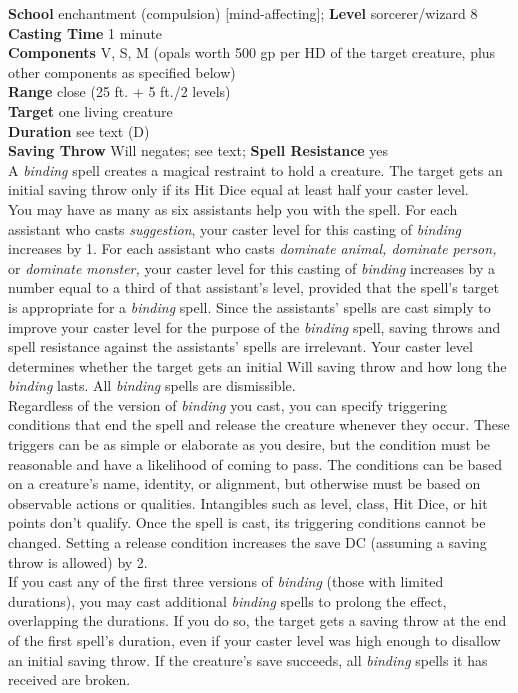\textbf{School} enchantment (compulsion) [mind-affecting]; \textbf{Level} sorcerer/wizard 8\\
\textbf{Casting Time} 1 minute\\
\textbf{Components} V, S, M (opals worth 500 gp per HD of the target creature, plus other components as specified below)\\
\textbf{Range} close (25 ft. + 5 ft./2 levels)\\
\textbf{Target} one living creature\\
\textbf{Duration} see text (D)\\
\textbf{Saving Throw }Will negates; see text; \textbf{Spell Resistance} yes\\
A \textit{binding }spell creates a magical restraint to hold a creature. The target gets an initial saving throw only if its Hit Dice equal at least half your caster level.\\
You may have as many as six assistants help you with the spell. For each assistant who casts \textit{suggestion}, your caster level for this casting of \textit{binding }increases by 1. For each assistant who casts \textit{dominate animal, dominate person, }or \textit{dominate monster, }your caster level for this casting of \textit{binding }increases by a number equal to a third of that assistant's level, provided that the spell's target is appropriate for a \textit{binding }spell. Since the assistants' spells are cast simply to improve your caster level for the purpose of the \textit{binding }spell, saving throws and spell resistance against the assistants' spells are irrelevant. Your caster level determines whether the target gets an initial Will saving throw and how long the \textit{binding }lasts. All \textit{binding }spells are dismissible.\\
Regardless of the version of \textit{binding }you cast, you can specify triggering conditions that end the spell and release the creature whenever they occur. These triggers can be as simple or elaborate as you desire, but the condition must be reasonable and have a likelihood of coming to pass. The conditions can be based on a creature's name, identity, or alignment, but otherwise must be based on observable actions or qualities. Intangibles such as level, class, Hit Dice, or hit points don't qualify. Once the spell is cast, its triggering conditions cannot be changed. Setting a release condition increases the save DC (assuming a saving throw is allowed) by 2.\\
If you cast any of the first three versions of \textit{binding }(those with limited durations), you may cast additional \textit{binding }spells to prolong the effect, overlapping the durations. If you do so, the target gets a saving throw at the end of the first spell's duration, even if your caster level was high enough to disallow an initial saving throw. If the creature's save succeeds, all \textit{binding }spells it has received are broken.\\
